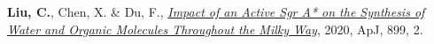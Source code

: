 


\begin{cvpubs}


\cvpub
{ %
\begin{cvitems}
\item {\textbf{Liu, C.}, Chen, X. \& Du, F., \href{https://iopscience.iop.org/article/10.3847/1538-4357/aba758}{\textit{Impact of an Active Sgr A* on the Synthesis of Water and Organic Molecules Throughout the Milky Way}}, 2020, ApJ, 899, 2.}
\end{cvitems}
}


\end{cvpubs}